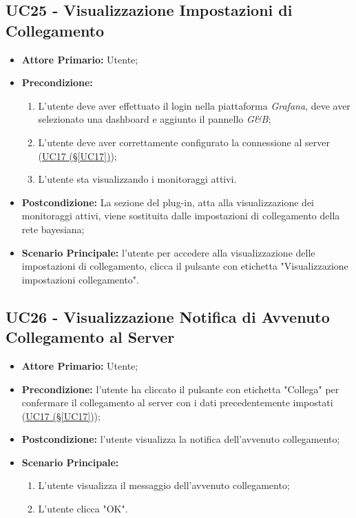 \pagebreak

\subsection{UC25 - Visualizzazione Impostazioni di Collegamento}\label{UC25}
\begin{itemize}
	\item \textbf{Attore Primario:} Utente;
	\item \textbf{Precondizione:} 
	\begin{enumerate}
		\item L'utente deve aver effettuato il login nella piattaforma \textit{Grafana}, deve aver selezionato una dashboard e aggiunto il pannello \textit{G\&B};
		\item L'utente deve aver correttamente configurato la connessione al server (\hyperref[UC17]{UC17 (§\ref*{UC17})});
		\item L'utente sta visualizzando i monitoraggi attivi.
	\end{enumerate}
	\item \textbf{Postcondizione:} La sezione del plug-in, atta alla visualizzazione dei monitoraggi attivi, viene sostituita dalle impostazioni di collegamento della rete bayesiana;
	\item \textbf{Scenario Principale:} l'utente per accedere alla visualizzazione delle impostazioni di collegamento, clicca il pulsante con etichetta "Visualizzazione impostazioni collegamento".
\end{itemize}

\pagebreak

\subsection{UC26 - Visualizzazione Notifica di Avvenuto Collegamento al Server}\label{UC26}

\begin{itemize}
	\item \textbf{Attore Primario:}  Utente;
	\item \textbf{Precondizione:} l'utente ha cliccato il pulsante con etichetta "Collega" per confermare il collegamento al server con i dati precedentemente impostati (\hyperref[UC17]{UC17 (§\ref*{UC17})});
	\item \textbf{Postcondizione:} l'utente visualizza la notifica dell'avvenuto collegamento;
	\item \textbf{Scenario Principale:}
	\begin{enumerate}
		\item L'utente visualizza il messaggio dell'avvenuto collegamento;
		\item L'utente clicca "OK".
	\end{enumerate}
\end{itemize}

